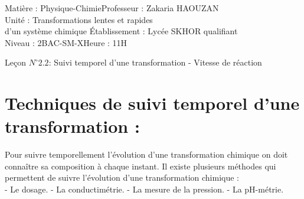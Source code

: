 \documentclass[12pt]{article}
\author{Zakaria HAOUZAN}
\date{\today}
\newcommand\headerMe[2]{\noindent{}#1\hfill#2}
\begin{document}
\headerMe{Matière : Physique-Chimie}{Professeur : Zakaria HAOUZAN}\\
\headerMe{Unité : Transformations lentes et rapides\\ d'un système chimique }{Établissement : Lycée SKHOR qualifiant}\\
\headerMe{Niveau : 2BAC-SM-X}{Heure : 11H}\\

\begin{center}

    \Large{Leçon $N^{\circ} 2.2 $: \color{red} Suivi temporel d’une transformation - Vitesse de réaction }
\end{center}







\section{Techniques de suivi temporel d'une transformation :}

Pour suivre temporellement l'évolution d'une transformation chimique on doit connaître sa composition à chaque instant.
Il existe plusieurs méthodes qui permettent de suivre l'évolution d'une transformation chimique : 
\\- Le dosage.
- La conductimétrie.
- La mesure de la pression.
- La pH-métrie.
\end{document}
